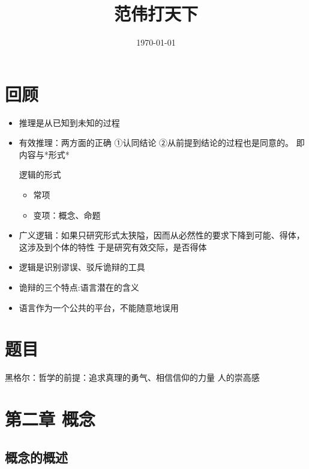 \documentclass[11pt]{article}
\date{\today}
\title{范伟打天下}
\begin{document}
\maketitle
\tableofcontents

\section{回顾}
\label{sec-1}
\begin{itemize}
\item 推理是从已知到未知的过程
\item 有效推理：两方面的正确
①认同结论 ②从前提到结论的过程也是同意的。 即内容与*形式*
\item[{逻辑的形式}] \begin{itemize}
\item 常项
\item 变项：概念、命题
\end{itemize}
\item 广义逻辑：如果只研究形式太狭隘，因而从必然性的要求下降到可能、得体，这涉及到个体的特性
于是研究有效交际，是否得体
\item 逻辑是识别谬误、驳斥诡辩的工具
\item 诡辩的三个特点:语言潜在的含义
\item 语言作为一个公共的平台，不能随意地误用
\end{itemize}
\section{题目}
\label{sec-2}
黑格尔：哲学的前提：追求真理的勇气、相信信仰的力量
      人的崇高感
\section{第二章 概念}
\label{sec-3}
\subsection{概念的概述}
\label{sec-3-1}
\end{document}
